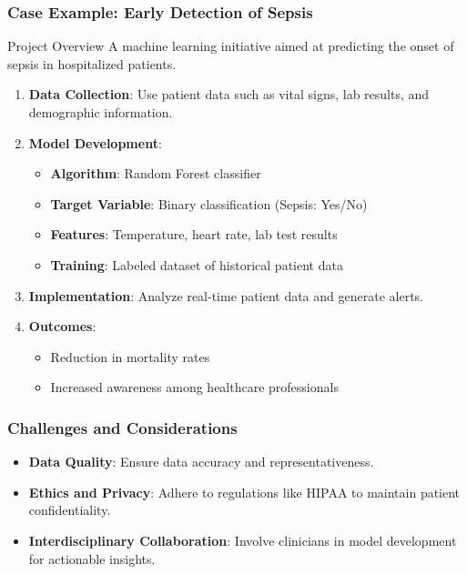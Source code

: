 \documentclass{beamer}
\begin{document}
\begin{frame}[fragile]
    \frametitle{Case Example: Early Detection of Sepsis}
    \begin{block}{Project Overview}
        A machine learning initiative aimed at predicting the onset of sepsis in hospitalized patients.
    \end{block}
    \begin{enumerate}
        \item \textbf{Data Collection}: Use patient data such as vital signs, lab results, and demographic information.
        \item \textbf{Model Development}:
        \begin{itemize}
            \item \textbf{Algorithm}: Random Forest classifier
            \item \textbf{Target Variable}: Binary classification (Sepsis: Yes/No)
            \item \textbf{Features}: Temperature, heart rate, lab test results
            \item \textbf{Training}: Labeled dataset of historical patient data
        \end{itemize}
        \item \textbf{Implementation}: Analyze real-time patient data and generate alerts.
        \item \textbf{Outcomes}: 
        \begin{itemize}
            \item Reduction in mortality rates
            \item Increased awareness among healthcare professionals
        \end{itemize}
    \end{enumerate}
\end{frame}

\begin{frame}[fragile]
    \frametitle{Challenges and Considerations}
    \begin{itemize}
        \item \textbf{Data Quality}: Ensure data accuracy and representativeness.
        \item \textbf{Ethics and Privacy}: Adhere to regulations like HIPAA to maintain patient confidentiality.
        \item \textbf{Interdisciplinary Collaboration}: Involve clinicians in model development for actionable insights.
    \end{itemize}
\end{frame}
\end{document}

